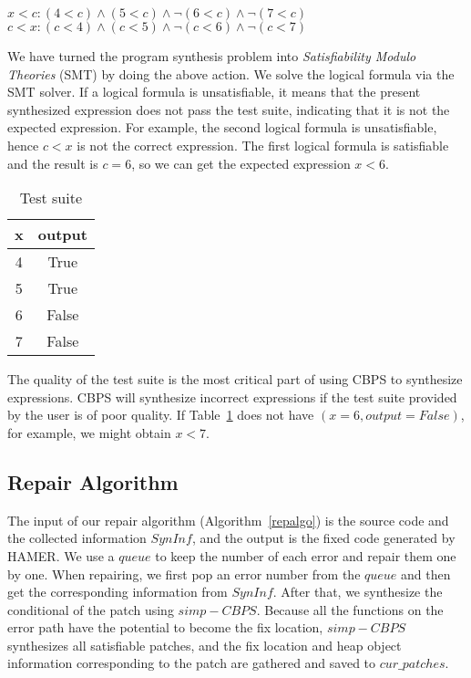 \documentclass[a4paper,11pt,oneside,openany]{book}
\begin{document}
\begin{minipage}{\textwidth}
    \vspace{0.2cm}
    \textsl{\hspace{0.3cm}$x<c: (4<c)\wedge(5<c)\wedge\neg(6<c)\wedge\neg(7<c)$\\\hspace{0.3cm}$c<x: (c<4)\wedge(c<5)\wedge\neg(c<6)\wedge\neg(c<7)$\\}
\end{minipage}
We have turned the program synthesis problem into {\it Satisfiability Modulo Theories} (SMT) by doing the above action. We solve the logical formula via the SMT solver. If a logical formula is unsatisfiable, it means that the present synthesized expression does not pass the test suite, indicating that it is not the expected expression. For example, the second logical formula is unsatisfiable, hence $c<x$ is not the correct expression. The first logical formula is satisfiable and the result is $c=6$, so we can get the expected expression $x<6$.


\begin{table}[h]
  \caption{Test suite}
  \label{test}
  \centering
  \begin{tabular}{|c|c|}
    \hline
     x & output \\
    \hline
     4 & True \\
     5 & True \\
     6 & False \\
     7 & False \\
    \hline
  \end{tabular}
\end{table}

The quality of the test suite is the most critical part of using CBPS to synthesize expressions. CBPS will synthesize incorrect expressions if the test suite provided by the user is of poor quality. If Table~\ref{test} does not have $(x=6, output=False)$, for example, we might obtain $x<7$.


\subsection{Repair Algorithm}
The input of our repair algorithm (Algorithm~\ref{repalgo}) is the source code and the collected information $SynInf$, and the output is the fixed code generated by HAMER. We use a $queue$ to keep the number of each error and repair them one by one. When repairing, we first pop an error number from the $queue$ and then get the corresponding information from $SynInf$. After that, we synthesize the conditional of the patch using $simp-CBPS$. Because all the functions on the error path have the potential to become the fix location, $simp-CBPS$ synthesizes all satisfiable patches, and the fix location and heap object information corresponding to the patch are gathered and saved to $cur\_patches$.
\end{document}
